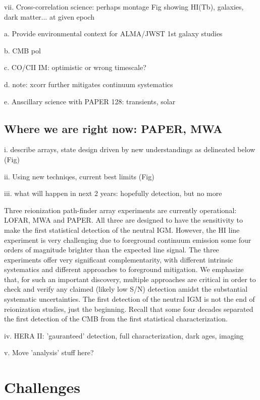\documentclass[preprint]{aastex}
\begin{document}
vii. Cross-correlation science: perhaps montage Fig showing HI(Tb), galaxies, dark matter... at given epoch
\cite{lidz11}

a. Provide environmental context for ALMA/JWST 1st galaxy studies

b. CMB pol 

c. CO/CII IM: optimistic or wrong timescale?
  
d. note: xcorr further mitigates continuum systematics

e. Anscillary science with PAPER 128: transients, solar 

\subsection{Where we are right now: PAPER, MWA}  %

i. describe arrays, state design driven by new understandings as delineated below (Fig)

ii. Using new techniqes, current best limits  (Fig)

iii. what will happen in next 2 years: hopefully detection, but no more

Three reionization path-finder array experiments are currently
operational: LOFAR, MWA and PAPER. All three are designed to have the
sensitivity to make the first statistical detection of the neutral
IGM. However, the HI line experiment is very challenging due to
foreground continuum emission some four orders of magnitude brighter
than the expected line signal.  The three experiments offer very
significant complementarity, with different intrinsic systematics and
different approaches to foreground mitigation. We emphasize that, for
such an important discovery, multiple approaches are critical in order
to check and verify any claimed (likely low S/N) detection amidst the
substantial systematic uncertainties. The first detection of
the neutral IGM is not the end of reionization studies, just the 
beginning. Recall that some four decades separated the first detection
of the CMB from the first statistical characterization. 


iv. HERA II: 'gauranteed' detection, full characterization, dark ages, imaging

v. Move 'analysis' stuff here?


\section{Challenges} %
\end{document}
